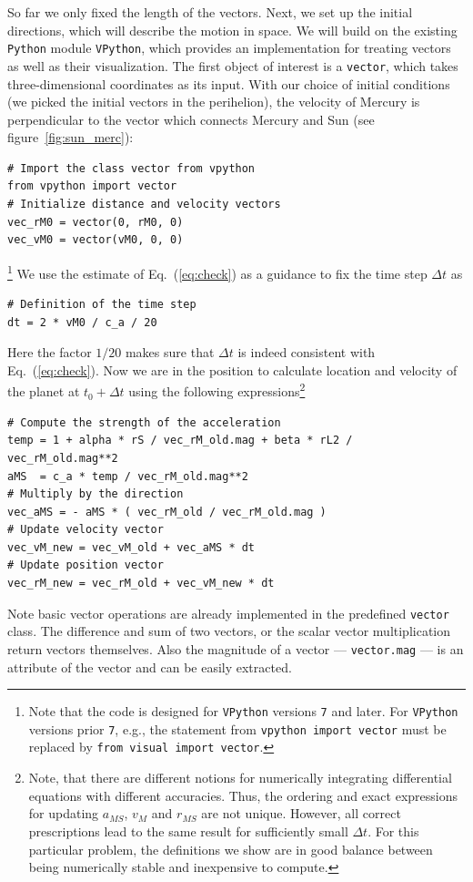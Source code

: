 \documentclass[12pt,ngerman,american]{iopart}
\newcommand{\python}[0]{\texttt{Python}}
\newcommand{\vpython}[0]{\texttt{VPython}}
\newcommand{\code}[1]{{\scriptsize\colorbox{light-gray}{\texttt{#1}}}}
\begin{document}
So far we only fixed the length of the vectors. Next, we set up the initial directions, which will describe the motion in space.
We will build on the existing \python{} module \vpython{}, which provides an implementation for treating vectors as well as their visualization.
The first object of interest is a \texttt{vector}, which takes three-dimensional coordinates as its input.
With our choice of initial conditions (we picked the initial vectors in the perihelion), the velocity of Mercury is perpendicular to the vector which connects Mercury and Sun (see figure~\ref{fig:sun_merc}):
\begin{lstlisting}
# Import the class vector from vpython
from vpython import vector
# Initialize distance and velocity vectors
vec_rM0 = vector(0, rM0, 0)
vec_vM0 = vector(vM0, 0, 0)
\end{lstlisting}\footnote{Note that the code is designed for \vpython{} versions \texttt{7} and later. For \vpython{} versions prior \texttt{7}, e.g., the statement from \code{vpython import vector}  must be replaced by \code{from visual import vector}.}
We use the estimate of Eq.~(\ref{eq:check}) as a guidance to fix the time step $\Delta t$ as
\begin{lstlisting}
# Definition of the time step
dt = 2 * vM0 / c_a / 20
\end{lstlisting}
Here the factor $1/20$ makes sure that $\Delta t$ is indeed consistent with Eq.~(\ref{eq:check}).
Now we are in the position to calculate location and velocity of the planet at $t_0+\Delta t$ using the following expressions\footnote{%
	Note, that there are different notions for numerically integrating differential equations with different accuracies.
	Thus, the ordering and exact expressions for updating $a_{MS}$, $v_M$ and $r_{MS}$ are not unique. However, all correct prescriptions lead to the same result for sufficiently small $\Delta t$.
	For this particular problem, the definitions we show are in good balance between being numerically stable and inexpensive to compute.
}%
\begin{lstlisting}
# Compute the strength of the acceleration
temp = 1 + alpha * rS / vec_rM_old.mag + beta * rL2 / vec_rM_old.mag**2
aMS  = c_a * temp / vec_rM_old.mag**2
# Multiply by the direction
vec_aMS = - aMS * ( vec_rM_old / vec_rM_old.mag )
# Update velocity vector
vec_vM_new = vec_vM_old + vec_aMS * dt
# Update position vector
vec_rM_new = vec_rM_old + vec_vM_new * dt
\end{lstlisting}
Note basic vector operations are already implemented in the predefined \texttt{vector} class.
The difference and sum of two vectors, or the scalar vector multiplication return vectors themselves.
Also the magnitude of a vector --- \code{vector.mag} --- is an attribute of the vector and can be easily extracted.
\end{document}
